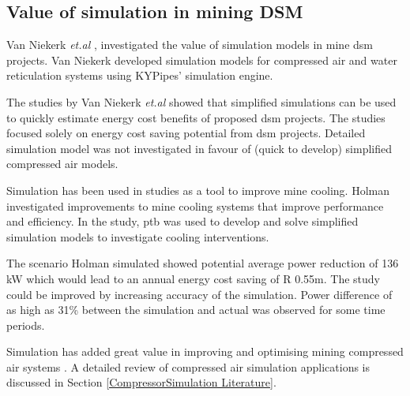 	\subsection{Value of simulation in mining DSM}
	Van Niekerk \textit{et.al} \cite{van2013value}, \cite{vanNiekerk2012Value} investigated the value of simulation models in mine \gls{dsm} projects. Van Niekerk developed simulation models for compressed air and water reticulation systems using KYPipes' simulation engine. 
	\par 
	The studies by Van Niekerk \textit{et.al} showed that simplified simulations can be used to quickly estimate  energy cost benefits of proposed \gls{dsm} projects. The studies focused solely on energy cost saving potential from \gls{dsm} projects. Detailed simulation model was not investigated in favour of (quick to develop) simplified compressed air models.
	\par
	Simulation has been used in studies as a tool to improve mine cooling. Holman \cite{Holman2014Masters} investigated improvements to mine cooling systems that improve performance and efficiency. In the study, \gls{ptb} was used to develop and solve simplified simulation models to investigate cooling interventions.
	\par 
	The scenario Holman simulated showed potential average power reduction of 136 kW which would lead to an annual energy cost saving of R 0.55m. The study could be improved by increasing accuracy of the simulation. Power difference of as high as 31\% between the simulation and actual was observed for some time periods.
	\par
	Simulation has added great value in improving and optimising mining compressed air systems
	. A detailed review of compressed air simulation applications is discussed in Section \ref{CompressorSimulation Literature}.
